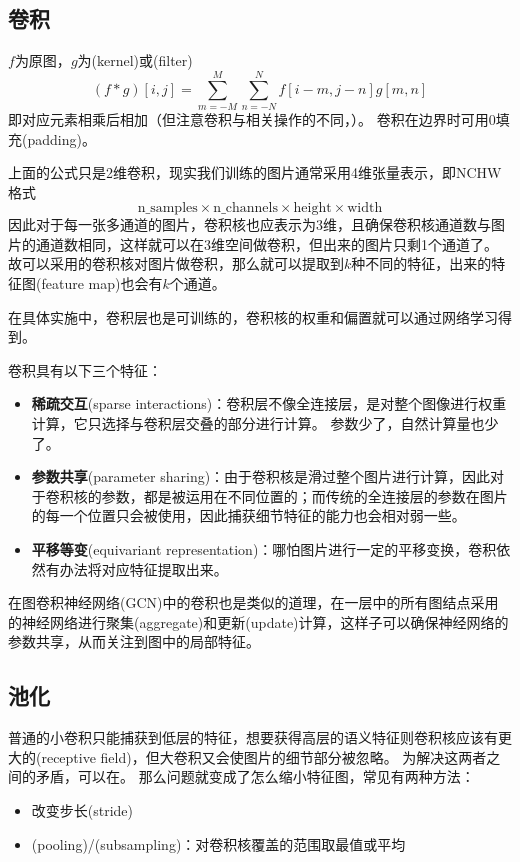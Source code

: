 \subsection{卷积}
$f$为原图，$g$为(kernel)或(filter)
\[(f*g)[i,j]=\sum_{m=-M}^M\sum_{n=-N}^Nf[i-m,j-n]g[m,n]\]
即对应元素相乘后相加（但注意卷积与相关操作的不同，）。
卷积在边界时可用0填充(padding)。

上面的公式只是2维卷积，现实我们训练的图片通常采用4维张量表示，即NCHW格式
\[\text{n\_samples}\times \text{n\_channels}\times \text{height}\times \text{width}\]
因此对于每一张多通道的图片，卷积核也应表示为3维，且确保卷积核通道数与图片的通道数相同，这样就可以在3维空间做卷积，但出来的图片只剩1个通道了。
故可以采用的卷积核对图片做卷积，那么就可以提取到$k$种不同的特征，出来的特征图(feature map)也会有$k$个通道。

在具体实施中，卷积层也是可训练的，卷积核的权重和偏置就可以通过网络学习得到。

卷积具有以下三个特征：
\begin{itemize}
    \item \textbf{稀疏交互}(sparse interactions)：卷积层不像全连接层，是对整个图像进行权重计算，它只选择与卷积层交叠的部分进行计算。
    参数少了，自然计算量也少了。
    \item \textbf{参数共享}(parameter sharing)：由于卷积核是滑过整个图片进行计算，因此对于卷积核的参数，都是被运用在不同位置的；而传统的全连接层的参数在图片的每一个位置只会被使用，因此捕获细节特征的能力也会相对弱一些。
    \item \textbf{平移等变}(equivariant representation)：哪怕图片进行一定的平移变换，卷积依然有办法将对应特征提取出来。
\end{itemize}

\bigskip
\begin{tcolorbox}
在图卷积神经网络(GCN)\cite{kipf:gcn_2017}中的卷积也是类似的道理，在一层中的所有图结点采用的神经网络进行聚集(aggregate)和更新(update)计算，这样子可以确保神经网络的参数共享，从而关注到图中的局部特征。
\end{tcolorbox}

\subsection{池化}
普通的小卷积只能捕获到低层的特征，想要获得高层的语义特征则卷积核应该有更大的(receptive field)，但大卷积又会使图片的细节部分被忽略。
为解决这两者之间的矛盾，可以在。
那么问题就变成了怎么缩小特征图，常见有两种方法：
\begin{itemize}
    \item 改变步长(stride)
    \item {}(pooling)/(subsampling)：对卷积核覆盖的范围取最值或平均
\end{itemize}

